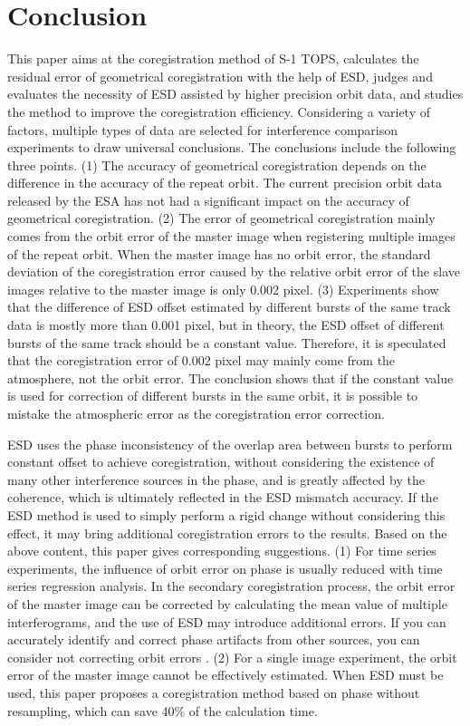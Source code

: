 \documentclass[a4paper,fleqn]{cas-sc}
\begin{document}
\section{Conclusion}
This paper aims at the coregistration method of S-1 TOPS, calculates the residual error of geometrical coregistration with the help of ESD, judges and evaluates the necessity of ESD assisted by higher precision orbit data, and studies the method to improve the coregistration efficiency. Considering a variety of factors, multiple types of data are selected for interference comparison experiments to draw universal conclusions. The conclusions include the following three points. (1) The accuracy of geometrical coregistration depends on the difference in the accuracy of the repeat orbit. The current precision orbit data released by the ESA has not had a significant impact on the accuracy of geometrical coregistration. (2) The error of geometrical coregistration mainly comes from the orbit error of the master image when registering multiple images of the repeat orbit. When the master image has no orbit error, the standard deviation of the coregistration error caused by the relative orbit error of the slave images relative to the master image is only 0.002 pixel. (3) Experiments show that the difference of ESD offset estimated by different bursts of the same track data is mostly more than 0.001 pixel, but in theory, the ESD offset of different bursts of the same track should be a constant value. Therefore, it is speculated that the coregistration error of 0.002 pixel may mainly come from the atmosphere, not the orbit error. The conclusion shows that if the constant value is used for correction of different bursts in the same orbit, it is possible to mistake the atmospheric error as the coregistration error correction. \par
ESD uses the phase inconsistency of the overlap area between bursts to perform constant offset to achieve coregistration, without considering the existence of many other interference sources in the phase, and is greatly affected by the coherence, which is ultimately reflected in the ESD mismatch accuracy. If the ESD method is used to simply perform a rigid change without considering this effect, it may bring additional coregistration errors to the results. Based on the above content, this paper gives corresponding suggestions. (1) For time series experiments, the influence of orbit error on phase is usually reduced with time series regression analysis. In the secondary coregistration process, the orbit error of the master image can be corrected by calculating the mean value of multiple interferograms, and the use of ESD may introduce additional errors. If you can accurately identify and correct phase artifacts from other sources, you can consider not correcting orbit errors \cite{InSAR_uncertainty_due_to_orbital_errors}. (2) For a single image experiment, the orbit error of the master image cannot be effectively estimated. When ESD must be used, this paper proposes a coregistration method based on phase without resampling, which can save 40\% of the calculation time. \par
\end{document}
